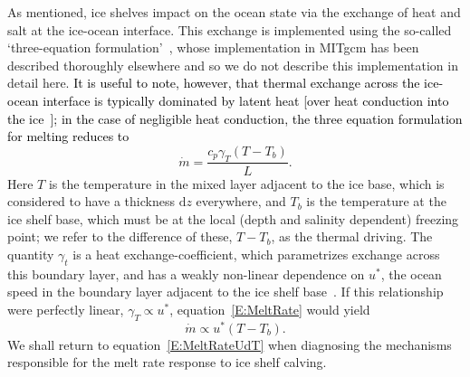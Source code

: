 \documentclass[draft]{agujournal2019}
\newcommand{\blue}[1]{\textcolor{blue}{#1}}
\newcommand{\red}[1]{\textcolor{red}{#1}}
\renewcommand{\blue}[1]{{\textcolor{black}{#1}}} %
\renewcommand{\red}[1]{{}} %
\begin{document}
As mentioned, ice shelves impact on the ocean state via the exchange of heat and salt at the ice-ocean interface. This exchange is implemented using the so-called `three-equation formulation'~\cite{Holland1999JPhysOcean}, whose implementation in MITgcm has been described thoroughly elsewhere \cite[for example]{Losch2008JGeophysResOceans, DeRydt2014JGeophysResOceans,Dansereau2014JGROceans} and so we do not describe this implementation in detail here. \red{It is useful to note, however, that the temperature difference between ice shelves and the adjacent ocean boundary layer is one to two orders of magnitude smaller than the temperature associated with phase changes ($L/c \approx -84{}^\circ$C, where $L=3.35\times10^5$ is the latent heat of fusion, and $c_p=3947~\si{\joule \kilogram}^{-1}$ is the specific heat capacity of water). Thus, thermal exchange across the ice-ocean interface is typically dominated by latent heat (over heat conduction into the ice). With latent heat dominated thermal exchange, the three equation formulation simplifies to give the melt rate $\dot{m}$ as}
\blue{It is useful to note, however, that thermal exchange across the ice-ocean interface is typically dominated by latent heat [over heat conduction into the ice~\cite{Holland1999JPhysOcean}]; in the case of negligible heat conduction, the three equation formulation for melting reduces to}
\begin{equation}\label{E:MeltRate}
    \dot{m} = \frac{c_p \gamma_T (T - T_b)}{L}.
\end{equation}
Here $T$ is the temperature in the mixed layer adjacent to the ice base, which is considered to have a thickness $\mathrm{d}z$ everywhere, and $T_b$ is the temperature at the ice shelf base, which must be at the local (depth and salinity dependent) freezing point; we refer to the difference of these, $T- T_b$, as the thermal driving. The quantity $\gamma_t$ is a heat exchange-coefficient, which parametrizes exchange across this boundary layer, and has a weakly non-linear dependence on $u^*$, the ocean speed in the boundary layer adjacent to the ice shelf base~\cite{Holland1999JPhysOcean}. If this relationship were perfectly linear, $\gamma_T \propto u^*$, equation~\eqref{E:MeltRate} would yield
\begin{equation}\label{E:MeltRateUdT}
    \dot{m} \propto u^* (T - T_b).
\end{equation}
We shall return to equation~\eqref{E:MeltRateUdT} when diagnosing the mechanisms responsible for the melt rate response to ice shelf calving.
\end{document}
